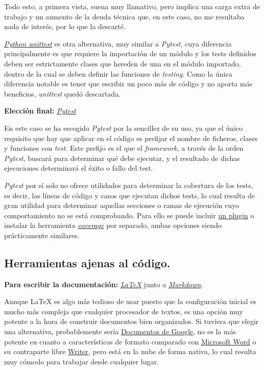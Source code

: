 Todo esto, a primera vista, suena muy llamativo, pero implica una carga extra de trabajo y un aumento de la deuda técnica que, en este caso, no me resultaba nada de interés, por lo que la descarté.

\href{https://docs.python.org/3/library/unittest.html}{\textit{Python unittest}} es otra alternativa, muy similar a \textit{Pytest}, cuya diferencia principalmente es que requiere la importación de un módulo y los tests definidos deben ser estrictamente clases que hereden de una en el módulo importado, dentro de la cual se deben definir las funciones de \textit{testing}. Como la única diferencia notable es tener que escribir un poco más de código y no aporta más beneficios, \textit{unittest} quedó descartada.

\textbf{Elección final:} \href{https://docs.Pytest.org/}{\textit{Pytest}}

En este caso se ha escogido \textit{Pytest} por la sencillez de su uso, ya que el único requisito que hay que aplicar en el código es prefijar el nombre de ficheros, clases y funciones con \textit{test}. Este prefijo es el que el \textit{framework}, a través de la orden \textit{Pytest}, buscará para determinar qué debe ejecutar, y el resultado de dichas ejecuciones determinará el éxito o fallo del test.

\textit{Pytest} por sí solo no ofrece utilidades para determinar la cobertura de los tests, es decir, las líneas de código y casos que ejecutan dichos tests, lo cual resulta de gran utilidad para determinar aquellas secciones o ramas de ejecución cuyo comportamiento no se está comprobando. Para ello se puede incluir \href{https://pypi.org/project/pytest-cov/}{un plugin} o instalar la herramienta \href{https://coverage.readthedocs.io/}{\textit{coverage}} por separado, ambas opciones siendo prácticamente similares.


\subsection{Herramientas ajenas al código.}

\textbf{Para escribir la documentación:} \href{https://www.latex-project.org/}{\textit{LaTeX}} junto a \href{https://www.markdownguide.org/getting-started/}{\textit{Markdown}}.

Aunque LaTeX es algo más tedioso de usar puesto que la configuración inicial es mucho más compleja que cualquier procesador de textos, es una opción muy potente a la hora de construir documentos bien organizados. Si tuviera que elegir una alternativa, probablemente sería \href{https://workspace.google.com/intl/es/products/docs/}{Documentos de Google}, no es la más potente en cuanto a características de formato comparado con \href{https://www.microsoft.com/es-es/microsoft-365/word}{Microsoft Word} o su contraparte libre \href{https://es.libreoffice.org/descubre/writer/}{Writer}, pero está en la nube de forma nativa, lo cual resulta muy cómodo para trabajar desde cualquier lugar.

